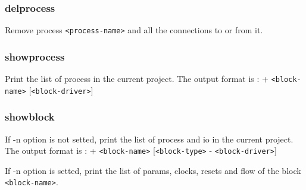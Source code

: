 \documentclass[10pt,a4paper]{article}
\begin{document}
\subsubsection{delprocess}

Remove process \texttt{<process-name>} and all the connections to or from it.


\subsubsection{showprocess}

Print the list of process in the current project. The output format is : + \texttt{<block-name>} [\texttt{<block-driver>}]


\subsubsection{showblock}

If -n option is not setted, print the list of process and io in the current project. The output format is : + \texttt{<block-name>} [\texttt{<block-type>} - \texttt{<block-driver>}]


If -n option is setted, print the list of params, clocks, resets and flow of the block \texttt{<block-name>}.
\end{document}

